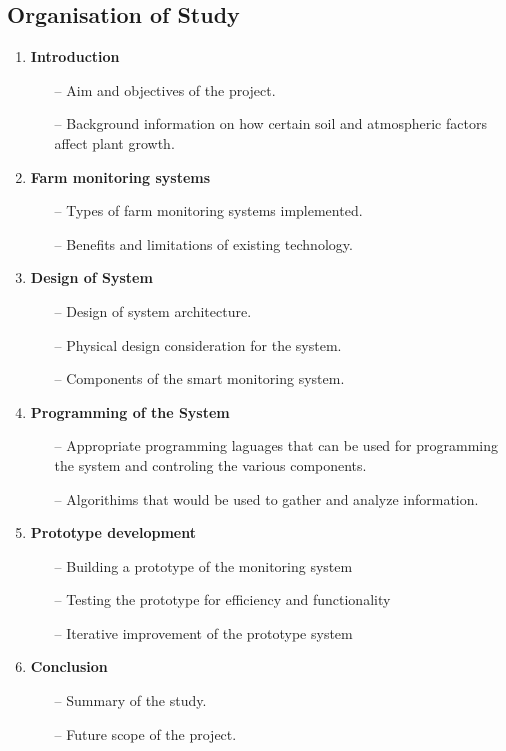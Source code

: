 \documentclass[12pt, a4paper]{article}
\begin{document}
\subsection{Organisation of Study}
\begin{enumerate}
\item \textbf{Introduction}
	\begin{itemize}
	\item[--] Aim and objectives of the project.
	\item[--] Background information on how certain soil and atmospheric factors affect plant    growth.
	\end{itemize}
\item \textbf{Farm monitoring systems}
\begin{itemize}
    \item[--] Types of farm monitoring systems implemented.
	\item[--] Benefits and limitations of existing technology.
\end{itemize}
\item \textbf{Design of System}
\begin{itemize}
	\item[--] Design of system architecture.
    \item[--] Physical design consideration for the system.
    \item[--] Components of the smart monitoring system.
\end{itemize}
\item \textbf{Programming of the System}
\begin{itemize}
	\item[--] Appropriate programming laguages that can be used for programming the system and controling the various components.
	\item[--] Algorithims that would be used to gather and analyze information.
\end{itemize}
\item \textbf{Prototype development}
\begin{itemize}
\item[--] Building a prototype of the monitoring system
\item[--] Testing the prototype for efficiency and functionality
\item[--] Iterative improvement of the prototype system
\end{itemize}
\item \textbf{Conclusion}
\begin{itemize}
	\item[--] Summary of the study.
	\item[--] Future scope of the project.
\end{itemize}
\end{enumerate}
\end{document}
